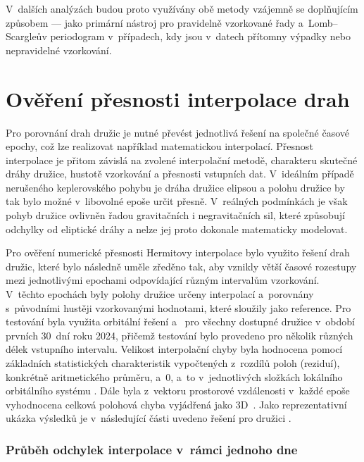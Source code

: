 V~dalších analýzách budou proto využívány obě metody vzájemně se doplňujícím způsobem ---  jako primární nástroj pro pravidelně vzorkované řady a~Lomb--Scargleův periodogram v~případech, kdy jsou v~datech přítomny výpadky nebo nepravidelné vzorkování.

\section{Ověření přesnosti interpolace drah}

Pro porovnání drah družic je nutné převést jednotlivá řešení na společné časové epochy, což lze realizovat například matematickou interpolací. Přesnost interpolace je přitom závislá na zvolené interpolační metodě, charakteru skutečné dráhy družice, hustotě vzorkování a přesnosti vstupních dat. V~ideálním případě nerušeného keplerovského pohybu je dráha družice elipsou a polohu družice by tak bylo možné v~libovolné epoše určit přesně. V~reálných podmínkách je však pohyb družice ovlivněn řadou gravitačních i negravitačních sil, které způsobují odchylky od eliptické dráhy a nelze jej proto dokonale matematicky modelovat.

Pro ověření numerické přesnosti Hermitovy interpolace bylo využito řešení drah družic, které bylo následně uměle zředěno tak, aby vznikly větší časové rozestupy mezi jednotlivými epochami odpovídající různým intervalům vzorkování. V~těchto epochách byly polohy družice určeny interpolací a~porovnány s~původními hustěji vzorkovanými hodnotami, které sloužily jako reference. Pro testování byla využita orbitální řešení  a~ pro všechny dostupné družice v~období prvních 30~dní roku 2024, přičemž testování bylo provedeno pro několik různých délek vstupního intervalu. Velikost interpolační chyby byla hodnocena pomocí základních statistických charakteristik vypočtených z~rozdílů poloh (reziduí), konkrétně aritmetického průměru,  a~0, a~to v~jednotlivých složkách lokálního orbitálního systému . Dále byla z~vektoru prostorové vzdálenosti v~každé epoše vyhodnocena celková polohová chyba vyjádřená jako 3D~. Jako reprezentativní ukázka výsledků je v~následující části uvedeno řešení  pro družici .

\subsubsection{Průběh odchylek interpolace v~rámci jednoho dne}

